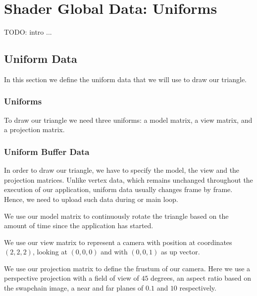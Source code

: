 \chapter{Shader Global Data: Uniforms}

TODO: intro ...

\section{Uniform Data}

In this section we define the uniform data that we will use to
draw our triangle.

\subsection{Uniforms}

To draw our triangle we need three uniforms:
a model matrix,
a view matrix,
and a projection matrix.

\begin{minipage}{\linewidth}{\noindent}
    
\end{minipage}

\subsection{Uniform Buffer Data}

In order to draw our triangle, we have to specify the model, the view and the
projection matrices.
Unlike vertex data, which remains unchanged throughout the execution of
our application, uniform data usually changes frame by frame.
Hence, we need to upload such data during or main loop.

We use our model matrix to continuously rotate the triangle based on the
amount of time since the application has started.

We use our view matrix to represent a camera with position at coordinates
$(2, 2, 2)$, looking at $(0, 0, 0)$ and with $(0, 0, 1)$ as up vector.

We use our projection matrix to define the frustum of our camera.
Here we use a perspective projection with a field of view of $45$ degrees,
an aspect ratio based on the swapchain image, a near and far planes of
$0.1$ and $10$ respectively.

\begin{minipage}{\linewidth}{\noindent}
    
\end{minipage}

